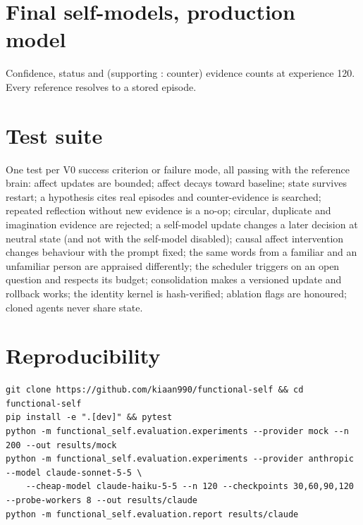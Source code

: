 \documentclass[11pt]{article}
\begin{document}
\section{Final self-models, production model}\label{app:realclaims}
Confidence, status and (supporting : counter) evidence counts at experience 120. Every reference resolves to a stored episode.


\section{Test suite}\label{app:tests}
One test per V0 success criterion or failure mode, all passing with the reference brain:
affect updates are bounded; affect decays toward baseline; state survives restart; a hypothesis cites real episodes and counter-evidence is searched; repeated reflection without new evidence is a no-op; circular, duplicate and imagination evidence are rejected; a self-model update changes a later decision at neutral state (and not with the self-model disabled); causal affect intervention changes behaviour with the prompt fixed; the same words from a familiar and an unfamiliar person are appraised differently; the scheduler triggers on an open question and respects its budget; consolidation makes a versioned update and rollback works; the identity kernel is hash-verified; ablation flags are honoured; cloned agents never share state.

\section{Reproducibility}
\begin{lstlisting}
git clone https://github.com/kiaan990/functional-self && cd functional-self
pip install -e ".[dev]" && pytest
python -m functional_self.evaluation.experiments --provider mock --n 200 --out results/mock
python -m functional_self.evaluation.experiments --provider anthropic --model claude-sonnet-5-5 \
    --cheap-model claude-haiku-5-5 --n 120 --checkpoints 30,60,90,120 --probe-workers 8 --out results/claude
python -m functional_self.evaluation.report results/claude
\end{lstlisting}
\end{document}
